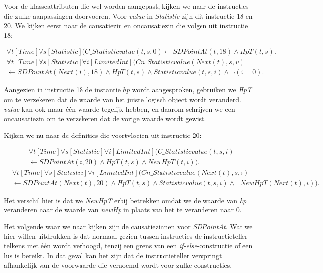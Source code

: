 Voor de klasseattributen die wel worden aangepast, kijken we naar de instructies die zulke aanpassingen doorvoeren. Voor \textit{value} in \textit{Statistic} zijn dit instructie 18 en 20. We kijken eerst naar de causatiezin en oncausatiezin die volgen uit instructie 18:

\begin{align*}
	\forall{t}[Time]\forall{s}[Statistic](C\_Statisticvalue(t, s, 0) \leftarrow SDPointAt(t, 18) \land HpT(t, s).
\end{align*}
\begin{align*}
	\forall{t}[Time]\forall{s}[Statistic]\forall{i}[LimitedInt](Cn\_Statisticvalue(Next(t), s, v) \\ \leftarrow SDPointAt(Next(t), 18) \land HpT(t, s) \land Statisticvalue(t, s, i) \land \lnot{}(i = 0).
\end{align*}

Aangezien in instructie 18 de instantie \textit{hp} wordt aangesproken, gebruiken we \textit{HpT} om te verzekeren dat de waarde van het juiste logisch object wordt veranderd. \textit{value} kan ook maar \'e\'en waarde tegelijk hebben, en daarom schrijven we een oncausatiezin om te verzekeren dat de vorige waarde wordt gewist.

Kijken we nu naar de definities die voortvloeien uit instructie 20:

\begin{align*}
	&\forall{t}[Time]\forall{s}[Statistic]\forall{i}[LimitedInt](C\_Statisticvalue(t, s, i) \\ &\leftarrow SDPointAt(t, 20) \land HpT(t, s) \land NewHpT(t, i)).
\end{align*}
\begin{align*}
&\forall{t}[Time]\forall{s}[Statistic]\forall{i}[LimitedInt](Cn\_Statisticvalue(Next(t), s, i) \\ &\leftarrow SDPointAt(Next(t), 20) \land HpT(t, s) \land Statisticvalue(t, s, i) \land \lnot{}NewHpT(Next(t), i)).
\end{align*}

Het verschil hier is dat we \textit{NewHpT} erbij betrekken omdat we de waarde van \textit{hp} veranderen naar de waarde van \textit{newHp} in plaats van het te veranderen naar 0.

\parbreak

Het volgende waar we naar kijken zijn de causatiezinnen voor \textit{SDPointAt}. Wat we hier willen uitdrukken is dat normaal gezien tussen instructies de instructieteller telkens met \'e\'en wordt verhoogd, tenzij een grens van een \textit{if-else}-constructie of een lus is bereikt. In dat geval kan het zijn dat de instructieteller verspringt afhankelijk van de voorwaarde die vernoemd wordt voor zulke constructies.


